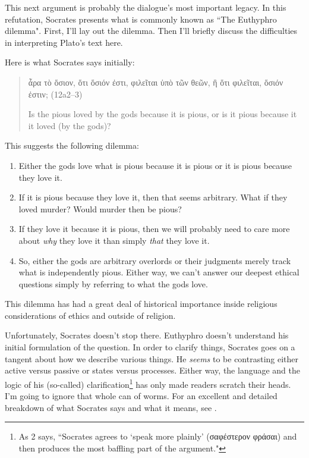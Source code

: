 \documentclass[11pt]{article}
\begin{document}
This next argument is probably the dialogue's most important legacy.  In this refutation, Socrates presents what is commonly known as ``The Euthyphro dilemma".  First, I'll lay out the dilemma.  Then I'll briefly discuss the difficulties in interpreting Plato's text here.

Here is what Socrates says initially:

\begin{quote}
    {\g ἆρα τὸ ὅσιον, ὅτι ὅσιόν ἐστι, φιλεῖται ὑπὸ τῶν θεῶν, ἢ ὅτι φιλεῖται, ὅσιόν ἐστιν;} (12a2--3)

    Is the pious loved by the gods because it is pious, or is it pious because it it loved (by the gods)?
\end{quote}

This suggests the following dilemma:

\begin{enumerate}
    \item Either the gods love what is pious because it is pious or it is pious because they love it.
    \item If it is pious because they love it, then that seems arbitrary.  What if they loved murder?  Would murder then be pious?
    \item If they love it because it is pious, then we will probably need to care more about \emph{why} they love it than simply \emph{that} they love it.
    \item So, either the gods are arbitrary overlords or their judgments merely track what is independently pious.  Either way, we can't answer our deepest ethical questions simply by referring to what the gods love.
\end{enumerate}

This dilemma has had a great deal of historical importance inside religious considerations of ethics and outside of religion.

Unfortunately, Socrates doesn't stop there.  Euthyphro doesn't understand his initial formulation of the question.  In order to clarify things, Socrates goes on a tangent about how we describe various things.  He \emph{seems} to be contrasting either active versus passive or states versus processes.  Either way, the language and the logic of his (so-called) clarification\footnote{As \cite{cohen1971} 2 says, ``Socrates agrees to `speak more plainly' ({\g σαφέστερον φράσαι}) and then produces the most baffling part of the argument."} has only made readers scratch their heads.  I'm going to ignore that whole can of worms.  For an excellent and detailed breakdown of what Socrates says and what it means, see \citet{cohen1971}.
\end{document}
